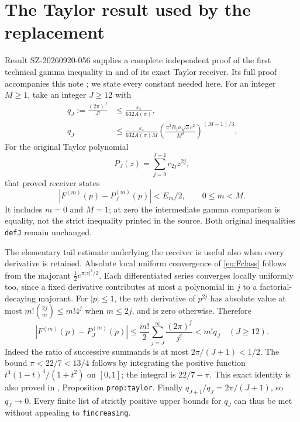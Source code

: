 \documentclass[11pt]{article}
\newcommand{\eps}{\varepsilon}
\begin{document}
\section{The Taylor result used by the replacement}\label{sec:taylor}
Result SZ-20260920-056 supplies a complete independent proof of
the first technical gamma inequality in \cite{AriasII} and of
its exact Taylor receiver. Its full proof accompanies this note
\cite{GammaProof}; we state every constant needed here.
For an integer $M\ge1$, take an integer $J\ge12$ with
\begin{align}
q_J:=\frac{(2\pi)^J}{J!}
&\le\frac{\eps_4}{632A(\sigma)},\label{eq:J1}\\
q_J&\le\frac{\eps_4}{632A(\sigma)M}
\left(\frac{\pi^2B_1a\sqrt3e^2}{M^2}\right)^{(M-1)/3}.
\label{eq:J2}
\end{align}
For the original Taylor polynomial
\begin{equation}\label{eq:P}
P_J(z)=\sum_{j=0}^{J-1}c_{2j}z^{2j},
\end{equation}
that proved receiver states
\begin{equation}\label{eq:Taylor}
|F^{(m)}(p)-P_J^{(m)}(p)|<E_m/2,
\qquad 0\le m<M.
\end{equation}
It includes $m=0$ and $M=1$; at zero the intermediate gamma
comparison is equality, not the strict inequality printed in
the source. Both original inequalities \texttt{defJ} remain unchanged.

The elementary tail estimate underlying the receiver is useful
also when every derivative is retained. Absolute local uniform
convergence of \eqref{eq:Fclass} follows from the majorant
$\tfrac12 e^{\pi |z|^2/2}$. Each differentiated series converges
locally uniformly too, since a fixed derivative contributes at
most a polynomial in $j$ to a factorial-decaying majorant.
For $|p|\le1$, the $m$th derivative of $p^{2j}$ has absolute
value at most $m!\binom{2j}{m}\le m!4^j$ when $m\le2j$,
and is zero otherwise. Therefore
\begin{equation}\label{eq:directtail}
|F^{(m)}(p)-P_J^{(m)}(p)|
\le\frac{m!}2\sum_{j=J}^\infty\frac{(2\pi)^j}{j!}
<m!q_J\quad(J\ge12).
\end{equation}
Indeed the ratio of successive summands is at most
$2\pi/(J+1)<1/2$. The bound $\pi<22/7<13/4$ follows by
integrating the positive function
$t^4(1-t)^4/(1+t^2)$ on $[0,1]$; the integral is
$22/7-\pi$. This exact identity is also proved in
\cite{GammaProof}, Proposition \texttt{prop:taylor}.
Finally $q_{J+1}/q_J=2\pi/(J+1)$, so $q_J\to0$.
Every finite list of strictly positive upper bounds for $q_J$
can thus be met without appealing to \texttt{fincreasing}.
\end{document}
